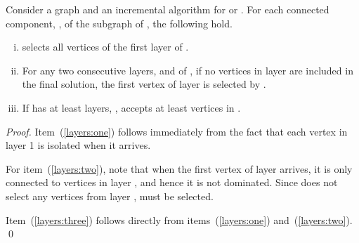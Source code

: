 \begin{lemma}
\label{lemma:layers}
Consider a graph  and an incremental algorithm \ALG for \ds or \cds.
For each connected component, , of the subgraph  of , the following hold.
\begin{enumerate}[(i)]
\item \label{layers:one}
 \ALG selects all vertices of the first layer of .
\item \label{layers:two}
  For any two consecutive layers,  and  of , if no
  vertices in layer  are included in the final solution, the first
  vertex of layer  is selected by \ALG.
\item \label{layers:three}
  If  has at least  layers, , \ALG accepts at least
   vertices in .
\end{enumerate}
\end{lemma}
\begin{proof}
Item~(\ref{layers:one}) follows immediately from the fact that each vertex in
layer 1 is isolated when it arrives. 

For item~(\ref{layers:two}), note that when the first vertex  of layer 
arrives, it is only connected to vertices in layer , and hence it
is not dominated. 
Since \ALG does not select any vertices from layer ,  must be
selected. 

Item~(\ref{layers:three}) follows directly from items~(\ref{layers:one})
and~(\ref{layers:two}).
\qed\end{proof}


